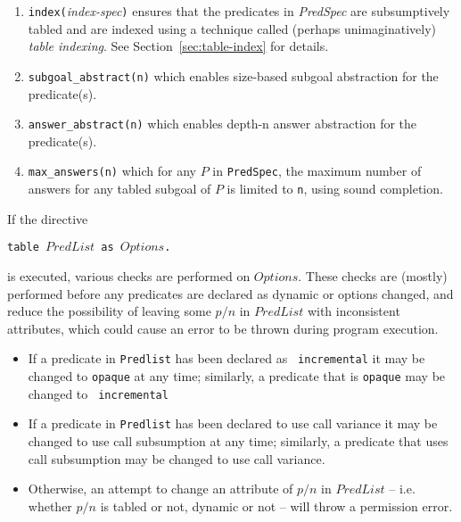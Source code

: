 \begin{description}
\begin{enumerate}
{  PredSpec} is such that incremental tables can depend on tables for
  $p/n$, but that tables for $p/n$ are not themselves incrementally
  maintained.
%
%
%
\item {\tt index(}{\em index-spec}{\tt )} ensures that the predicates
  in {\em PredSpec} are subsumptively tabled and are indexed using a
  technique called (perhaps unimaginatively) {\em table indexing}.  See
  Section~\ref{sec:table-index} for details.
  
\item {\tt subgoal\_abstract(n)}  which enables size-based subgoal abstraction for the predicate(s).
%
\item {\tt answer\_abstract(n)} which enables depth-n answer
  abstraction for the predicate(s).
%
\item {\tt max\_answers(n)} which for any $P$ in {\tt PredSpec}, the
  maximum number of answers for any tabled subgoal of $P$ is limited
  to {\tt n}, using sound completion.
%
\ei
\ei
\end{enumerate}

If the directive 

{\tt  table $PredList$ as $Options$.}

is executed, various checks are performed on $Options$.  These checks
are (mostly) performed before any predicates are declared as dynamic
or options changed, and reduce the possibility of leaving some $p/n$
in $PredList$ with inconsistent attributes, which could cause an error
to be thrown during program execution.
%
\begin{itemize}
\item If a predicate in {\tt Predlist} has been declared as {\tt
  incremental} it may be changed to {\tt opaque} at any time;
  similarly, a predicate that is {\tt opaque} may be changed to {\tt
    incremental}
%
\item If a predicate in {\tt Predlist} has been declared to use call
  variance it may be changed to use call subsumption at any time;
  similarly, a predicate that uses call subsumption may be changed to
  use call variance.
%
\item Otherwise, an attempt to change an attribute of $p/n$ in
  $PredList$ -- i.e. whether $p/n$ is tabled or not, dynamic or not
  -- will throw a permission error.
\end{itemize}


\end{description}
